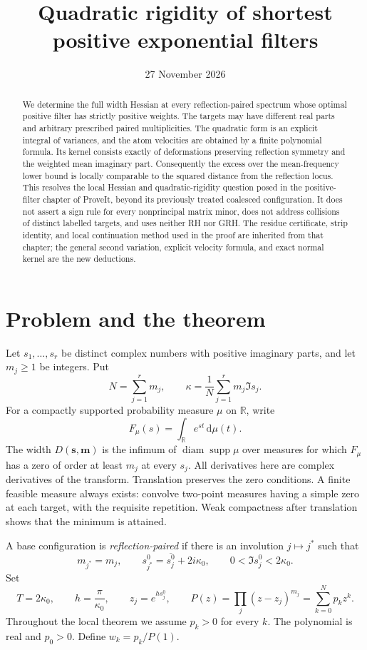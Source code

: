 \documentclass[11pt]{article}
\title{Quadratic rigidity of shortest positive exponential filters}
\author{}
\date{27 November 2026}
\theoremstyle{remark}\newtheorem{remark}[theorem]{Remark}
\newcommand{\R}{\mathbb R}\newcommand{\C}{\mathbb C}
\newcommand{\dd}{\,\mathrm d}
\DeclareMathOperator{\diam}{diam}
\DeclareMathOperator{\supp}{supp}
\begin{document}
\maketitle
\begin{abstract}
We determine the full width Hessian at every reflection-paired spectrum whose optimal positive filter has strictly positive weights. The targets may have different real parts and arbitrary prescribed paired multiplicities. The quadratic form is an explicit integral of variances, and the atom velocities are obtained by a finite polynomial formula. Its kernel consists exactly of deformations preserving reflection symmetry and the weighted mean imaginary part. Consequently the excess over the mean-frequency lower bound is locally comparable to the squared distance from the reflection locus. This resolves the local Hessian and quadratic-rigidity question posed in the positive-filter chapter of ProveIt, beyond its previously treated coalesced configuration. It does not assert a sign rule for every nonprincipal matrix minor, does not address collisions of distinct labelled targets, and uses neither RH nor GRH. The residue certificate, strip identity, and local continuation method used in the proof are inherited from that chapter; the general second variation, explicit velocity formula, and exact normal kernel are the new deductions.
\end{abstract}

\section{Problem and the theorem}

Let $s_1,\ldots,s_r$ be distinct complex numbers with positive imaginary parts, and let $m_j\ge1$ be integers. Put
\[
 N=\sum_{j=1}^r m_j,\qquad
 \kappa=\frac1N\sum_{j=1}^r m_j\Im s_j.
\]
For a compactly supported probability measure $\mu$ on $\R$, write
\[
 F_\mu(s)=\int_\R e^{st}\dd\mu(t).
\]
The width $D(\boldsymbol s,\boldsymbol m)$ is the infimum of $\diam\supp\mu$ over measures for which $F_\mu$ has a zero of order at least $m_j$ at every $s_j$. All derivatives here are complex derivatives of the transform. Translation preserves the zero conditions. A finite feasible measure always exists: convolve two-point measures having a simple zero at each target, with the requisite repetition. Weak compactness after translation shows that the minimum is attained.

A base configuration is \emph{reflection-paired} if there is an involution $j\mapsto j^*$ such that
\begin{equation}\label{eq:mirror}
 m_{j^*}=m_j,\qquad s_{j^*}^0=\overline{s_j^0}+2i\kappa_0,
 \qquad 0<\Im s_j^0<2\kappa_0.
\end{equation}
Set
\begin{equation}\label{eq:base}
 T=2\kappa_0,\qquad h=\frac{\pi}{\kappa_0},\qquad
 z_j=e^{hs_j^0},\qquad
 P(z)=\prod_j(z-z_j)^{m_j}=\sum_{k=0}^N p_kz^k.
\end{equation}
Throughout the local theorem we assume $p_k>0$ for every $k$. The polynomial is real and $p_0>0$. Define $w_k=p_k/P(1)$.
\end{document}
